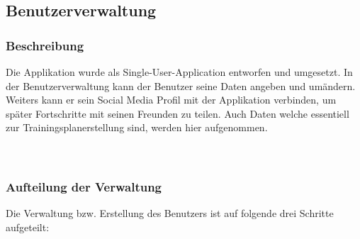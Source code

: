 \documentclass[FIPLY_base.tex]{subfiles}
\begin{document}
\subsection{Benutzerverwaltung}
\subsubsection{Beschreibung}
Die Applikation wurde als Single-User-Application entworfen und umgesetzt. In der Benutzerverwaltung kann der Benutzer seine
Daten angeben und umändern. Weiters kann er sein Social Media Profil mit der Applikation verbinden, um später Fortschritte mit seinen Freunden zu teilen.
Auch Daten welche essentiell zur Trainingsplanerstellung sind, werden hier aufgenommen.
\\\
\\\

\subsubsection{Aufteilung der Verwaltung}
Die Verwaltung bzw. Erstellung des Benutzers ist auf folgende drei Schritte aufgeteilt:
\end{document}
